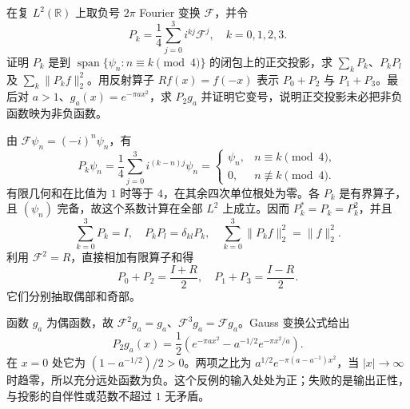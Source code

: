 \begin{exercise}\label{b2:ex:B2-fourier-projections}
在复 \(L^2(\mathbb R)\) 上取负号 \(2\pi\) Fourier 变换 \(\mathcal F\)，并令
\[
 P_k=\frac14\sum_{j=0}^3 i^{kj}\mathcal F^j,
 \quad k=0,1,2,3.
\]
证明 \(P_k\) 是到 \(\operatorname{span}\{\psi_n:n\equiv k\pmod4\}\) 的闭包上的正交投影，求 \(\sum_kP_k\)、\(P_kP_l\) 及 \(\sum_k\|P_kf\|_2^2\)。用反射算子 \(Rf(x)=f(-x)\) 表示 \(P_0+P_2\) 与 \(P_1+P_3\)。最后对 \(a>1\)、\(g_a(x)=e^{-\pi ax^2}\)，求 \(P_2g_a\) 并证明它变号，说明正交投影未必把非负函数映为非负函数。
\end{exercise}
\begin{solution}
由 \(\mathcal F\psi_n=(-i)^n\psi_n\)，有
\[
 P_k\psi_n=\frac14\sum_{j=0}^3i^{(k-n)j}\psi_n
 =\begin{cases}\psi_n,&n\equiv k\pmod4,\\0,&n\not\equiv k\pmod4.\end{cases}
\]
有限几何和在比值为 \(1\) 时等于 \(4\)，在其余四次单位根处为零。各 \(P_k\) 是有界算子，且 \((\psi_n)\) 完备，故这个系数计算在全部 \(L^2\) 上成立。因而 \(P_k^*=P_k=P_k^2\)，并且
\[
 \sum_{k=0}^3P_k=I,\quad P_kP_l=\delta_{kl}P_k,
 \quad \sum_{k=0}^3\|P_kf\|_2^2=\|f\|_2^2.
\]
利用 \(\mathcal F^2=R\)，直接相加有限算子和得
\[
 P_0+P_2=\frac{I+R}{2},\quad
 P_1+P_3=\frac{I-R}{2}.
\]
它们分别抽取偶部和奇部。

函数 \(g_a\) 为偶函数，故 \(\mathcal F^2g_a=g_a\)、\(\mathcal F^3g_a=\mathcal Fg_a\)。Gauss 变换公式给出
\[
 P_2g_a(x)=\frac12\left(e^{-\pi ax^2}
                  -a^{-1/2}e^{-\pi x^2/a}\right).
\]
在 \(x=0\) 处它为 \((1-a^{-1/2})/2>0\)。两项之比为 \(a^{1/2}e^{-\pi(a-a^{-1})x^2}\)，当 \(|x|\to\infty\) 时趋零，所以充分远处函数为负。这个反例的输入处处为正；失败的是输出正性，与投影的自伴性或范数不超过 \(1\) 无矛盾。
\end{solution}

